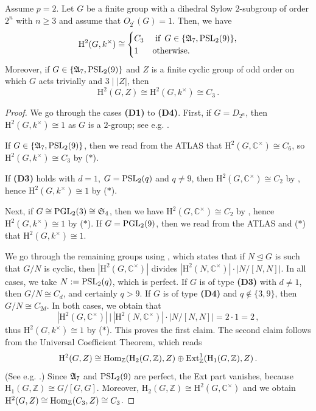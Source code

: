 \begin{lem}\label{lem:SchurMult_2prime}
Assume $p=2$. Let $G$ be a finite group with a dihedral Sylow $2$-subgroup of order $2^n$ with $n\geq 3$ and assume that $O_{2^\prime}(G)=1$. Then, we have 
\[
{\mathrm{H}}^2(G, k^\times)\cong  \begin{cases}
    C_3  & \text{ if } \,  G
\in \{\mathfrak{A}_7, \operatorname{PSL}_2(9)\}, \\
    1  & \text{otherwise}.
\end{cases}
\]
Moreover, if $G
\in \{\mathfrak{A}_7, \operatorname{PSL}_2(9)\}$ and $Z$ is a finite cyclic group of odd order on which $G$ acts trivially and $3\mid |Z|$, then 
\[
{\mathrm{H}}^2(G, Z)\cong {\mathrm{H}}^2(G, k^\times)\cong C_3\,.
\]
\end{lem}

\begin{proof} 
We go through the cases {\bf (D1)} to {\bf (D4)}.  First, if $G=D_{2^n}$, then ${\mathrm{H}}^2(G, k^\times)\cong 1$ as $G$ is a $2$-group; see e.g. \cite[Chapter 2, Theorem~7.4]{NagaoTsushimaBook}.
\par
If $G\in\{{\mathfrak{A}}_7,\operatorname{PSL}_2(9)\}$, then we read from the ATLAS \cite[p.10 and p.4 resp.]{ATLAS} that ${\mathrm{H}}^2(G,\mathbb{C}^\times)\cong C_6$, so ${\mathrm{H}}^2(G, k^\times)\cong C_3$ by ($\ast$). 
\par
If {\bf (D3)} holds with $d=1$, $G=\operatorname{PSL}_2(q)$  and $q\neq 9$, then ${\mathrm{H}}^2(G,\mathbb{C}^\times)\cong C_2$  by \cite[Chapter~3, \S3 with Table~5]{ATLAS}, hence  ${\mathrm{H}}^2(G, k^\times)\cong 1$ by ($\ast$).
\par
Next, if $G\cong \operatorname{PGL}_2(3)\cong\mathfrak S_4$, then we have ${\mathrm{H}}^2(G, \mathbb{C}^\times)\cong C_2$
 by \cite[2.12.3 Theorem]{KarpilovskySchurMultBook}, hence ${\mathrm{H}}^2(G, k^\times)\cong 1$ by ($\ast$). If $G=\operatorname{PGL}_2(9)$, then we read from the ATLAS \cite[bottom of p.5 together with page xxii]{ATLAS} and ($\ast$) that ${\mathrm{H}}^2(G, k^\times)\cong 1$. 
\par
We go through the remaining groups using \cite[Theorem 3.1(c)]{Jones74}, which states that if $N\unlhd G$ is such that $G/N$ is cyclic, then 
$|{\mathrm{H}}^2(G,\mathbb{C}^\times)|$ divides $|{\mathrm{H}}^2(N,\mathbb{C}^\times)|\cdot |N/[N,N]|$. In all cases, we take $N:=\operatorname{PSL}_2(q)$, which is perfect. If $G$ is of type {\bf (D3)} with $d\neq 1$, then $G/N\cong C_d$, and certainly $q>9$.  If $G$ is of type {\bf (D4)} and $q\notin\{3,9\}$, then $G/N\cong C_{2d}$. In both cases, we obtain that 
\[
|{\mathrm{H}}^2(G,\mathbb{C}^\times)|\,\big|\,|{\mathrm{H}}^2(N,\mathbb{C}^\times)|\cdot |N/[N,N]|=2\cdot 1=2\,,
\]
thus ${\mathrm{H}}^2(G, k^\times)\cong 1$ by ($\ast$). This proves the first claim. The second claim follows from the Universal Coefficient Theorem, which reads  
\[
{\mathrm{H}}^2(G, Z) \cong \operatorname{Hom}_{{\mathbb{Z}}}({\mathrm{H}}_2(G, \mathbb{Z}), Z) \oplus \operatorname{Ext}^1_{\mathbb{Z}}({\mathrm{H}}_1(G, \mathbb{Z}), Z)\,.
\]
(See e.g. \cite[Exercise~6.1.5]{WeibelBook}.)
Since ${\mathfrak{A}}_7$ and $\operatorname{PSL}_2(9)$ are perfect, the Ext part vanishes, because  ${\mathrm{H}}_1(G, \mathbb{Z})\cong G/[G,G]$. Moreover, $ {\mathrm{H}}_2(G,\mathbb{Z})\cong {\mathrm{H}}^2(G,\mathbb{C}^\times)$ and we obtain ${\mathrm{H}}^2(G, Z)\cong \operatorname{Hom}_{{\mathbb{Z}}}(C_3, Z)\cong C_3$. 
\end{proof}
